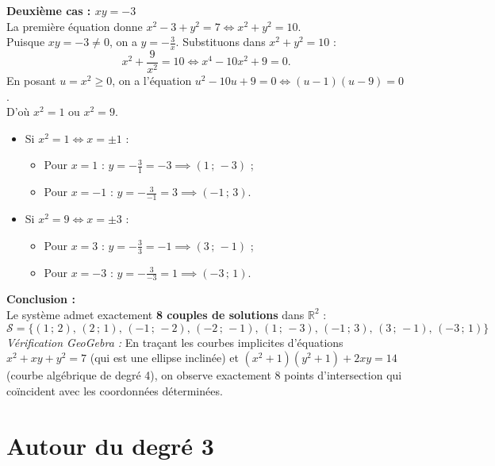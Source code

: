 \documentclass[11pt,a4paper]{article}
\begin{document}
\begin{correctionbox}
\textbf{Deuxième cas : $xy = -3$}\\
La première équation donne $x^2 - 3 + y^2 = 7 \iff x^2 + y^2 = 10$.\\
Puisque $xy = -3 \ne 0$, on a $y = -\frac{3}{x}$. Substituons dans $x^2 + y^2 = 10$ :
\[
x^2 + \frac{9}{x^2} = 10 \iff x^4 - 10x^2 + 9 = 0.
\]
En posant $u = x^2 \ge 0$, on a l'équation $u^2 - 10u + 9 = 0 \iff (u - 1)(u - 9) = 0$.\\
D'où $x^2 = 1$ ou $x^2 = 9$.
\begin{itemize}[leftmargin=*,label=\textbullet]
    \item Si $x^2 = 1 \iff x = \pm 1$ :
    \begin{itemize}
        \item Pour $x = 1$ : $y = -\frac{3}{1} = -3 \implies (1\,;\,-3)$ ;
        \item Pour $x = -1$ : $y = -\frac{3}{-1} = 3 \implies (-1\,;\,3)$.
    \end{itemize}
    \item Si $x^2 = 9 \iff x = \pm 3$ :
    \begin{itemize}
        \item Pour $x = 3$ : $y = -\frac{3}{3} = -1 \implies (3\,;\,-1)$ ;
        \item Pour $x = -3$ : $y = -\frac{3}{-3} = 1 \implies (-3\,;\,1)$.
    \end{itemize}
\end{itemize}

\textbf{Conclusion :}\\
Le système admet exactement \textbf{8 couples de solutions} dans $\mathbb{R}^2$ :
\[
\boxed{\mathcal{S} = \bigl\{ (1\,;\,2),\, (2\,;\,1),\, (-1\,;\,-2),\, (-2\,;\,-1),\, (1\,;\,-3),\, (-1\,;\,3),\, (3\,;\,-1),\, (-3\,;\,1) \bigr\}}
\]
\textit{Vérification GeoGebra :} En traçant les courbes implicites d'équations $x^2 + xy + y^2 = 7$ (qui est une ellipse inclinée) et $(x^2+1)(y^2+1)+2xy = 14$ (courbe algébrique de degré 4), on observe exactement $8$ points d'intersection qui coïncident avec les coordonnées déterminées.
\end{correctionbox}


\section{Autour du degré 3}
\end{document}
